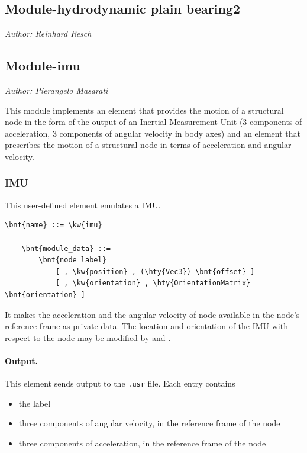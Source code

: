 


\subsection{Module-hydrodynamic plain bearing2}
\emph{Author: Reinhard Resch}



\subsection{Module-imu}
\emph{Author: Pierangelo Masarati}

\noindent
This module implements an element that provides the motion of a structural node
in the form of the output of an Inertial Measurement Unit
(3 components of acceleration, 3 components of angular velocity in body axes)
and an element that prescribes the motion of a structural node
in terms of acceleration and angular velocity.

\subsubsection{IMU}
This user-defined element emulates a IMU.
\begin{Verbatim}[commandchars=\\\{\}]
    \bnt{name} ::= \kw{imu}

    \bnt{module_data} ::=
        \bnt{node_label}
            [ , \kw{position} , (\hty{Vec3}) \bnt{offset} ]
            [ , \kw{orientation} , \hty{OrientationMatrix} \bnt{orientation} ]
\end{Verbatim}
It makes the acceleration and the angular velocity of node 
available in the node's reference frame as private data.
The location and orientation of the IMU with respect to the node may be modified
by  and .

\paragraph{Output.}
This element sends output to the \texttt{.usr} file.
Each entry contains
\begin{itemize}
\item[1)] the label
\item[2--4)] three components of angular velocity, in the reference frame of the node
\item[5--7)] three components of acceleration, in the reference frame of the node
\end{itemize}

